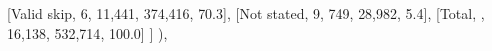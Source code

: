 \documentclass[
  11pt,
  a4paper,
]{article}
\newenvironment{Shaded}{\begin{snugshade}}{\end{snugshade}}
\newcommand{\NormalTok}[1]{\textcolor[rgb]{0.00,0.23,0.31}{#1}}
\newcommand{\StringTok}[1]{\textcolor[rgb]{0.13,0.47,0.30}{#1}}
\begin{document}
\begin{Shaded}
\begin{Highlighting}[]
\NormalTok{                    [}\StringTok{\textquotesingle{}Valid skip\textquotesingle{}}\NormalTok{, }\StringTok{\textquotesingle{}6\textquotesingle{}}\NormalTok{, }\StringTok{\textquotesingle{}11,441\textquotesingle{}}\NormalTok{, }\StringTok{\textquotesingle{}374,416\textquotesingle{}}\NormalTok{, }\StringTok{\textquotesingle{}70.3\textquotesingle{}}\NormalTok{],}
\NormalTok{                    [}\StringTok{\textquotesingle{}Not stated\textquotesingle{}}\NormalTok{, }\StringTok{\textquotesingle{}9\textquotesingle{}}\NormalTok{, }\StringTok{\textquotesingle{}749\textquotesingle{}}\NormalTok{, }\StringTok{\textquotesingle{}28,982\textquotesingle{}}\NormalTok{, }\StringTok{\textquotesingle{}5.4\textquotesingle{}}\NormalTok{],}
\NormalTok{                    [}\StringTok{\textquotesingle{}Total\textquotesingle{}}\NormalTok{, }\StringTok{\textquotesingle{}\textquotesingle{}}\NormalTok{, }\StringTok{\textquotesingle{}16,138\textquotesingle{}}\NormalTok{, }\StringTok{\textquotesingle{}532,714\textquotesingle{}}\NormalTok{, }\StringTok{\textquotesingle{}100.0\textquotesingle{}}\NormalTok{]}
\NormalTok{                ]}
\NormalTok{            ),}
            

\end{Highlighting}
\end{Shaded}
\end{document}
